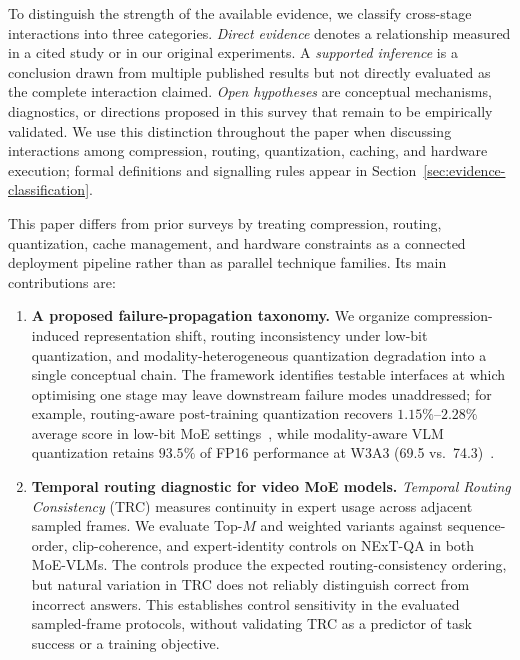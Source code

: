 \documentclass[10pt]{article}
\newenvironment{reviewchange}{\begingroup\color{red}}{\endgroup}
\begin{document}
\begin{reviewchange}
To distinguish the strength of the available evidence, we classify cross-stage
interactions into three categories.  \emph{Direct evidence} denotes a relationship
measured in a cited study or in our original experiments.  A \emph{supported inference} is a conclusion drawn
from multiple published results but not directly evaluated as the complete interaction
claimed.  \emph{Open hypotheses} are conceptual mechanisms, diagnostics, or
directions proposed in this survey that remain to be empirically validated.  We use
this distinction throughout the paper when discussing interactions among compression,
routing, quantization, caching, and hardware execution; formal definitions and signalling
rules appear in Section~\ref{sec:evidence-classification}.

This paper differs from prior surveys by treating compression, routing, quantization,
cache management, and hardware constraints as a connected deployment pipeline rather
than as parallel technique families.  Its main contributions are:
\begin{enumerate}[leftmargin=2em, itemsep=4pt]
  \item \textbf{A proposed failure-propagation taxonomy.}  We organize
  compression-induced representation shift, routing inconsistency under low-bit
  quantization, and modality-heterogeneous quantization degradation into a single
  conceptual chain.  The framework identifies testable interfaces at which optimising
  one stage may leave downstream failure modes unaddressed; for example,
  routing-aware post-training quantization
  recovers $1.15\%$--$2.28\%$ average score in low-bit MoE settings~\citep{fu2026eaquantenhancingposttrainingquantization}, while
  modality-aware VLM quantization retains $93.5\%$ of FP16 performance at W3A3
  (69.5 vs.\ 74.3)~\citep{zhong2026breakingmodalityheterogeneitylowbit}.

  \item \textbf{Temporal routing diagnostic for video MoE models.}
  \emph{Temporal Routing Consistency} (TRC) measures continuity in expert usage across
adjacent sampled frames. We evaluate Top-$M$ and weighted variants against
sequence-order, clip-coherence, and expert-identity controls on NExT-QA in both
MoE-VLMs. The controls produce the expected routing-consistency ordering, but natural
variation in TRC does not reliably distinguish correct from incorrect answers.
This establishes control sensitivity in the evaluated sampled-frame protocols,
without validating TRC as a predictor of task success or a training objective.


\end{enumerate}
\end{reviewchange}
\end{document}
